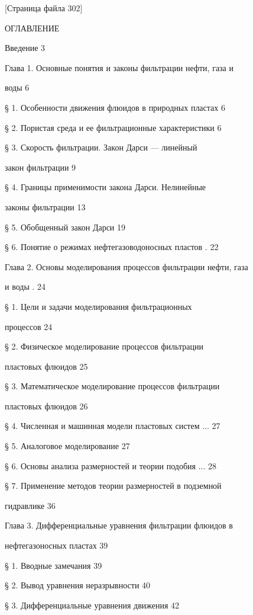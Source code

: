 \documentclass[
  11pt,
]{article}
\begin{document}
\begingroup\small\setlength{\parindent}{0pt}\setlength{\parskip}{1pt}
{[}Страница файла 302{]}\par
ОГЛАВЛЕНИЕ \par
Введение 3 \par
Глава 1. Основные понятия и законы фильтрации нефти, газа и \par
воды 6 \par
§ 1. Особенности движения флюидов в природных пластах 6 \par
§ 2. Пористая среда и ее фильтрационные характеристики 6 \par
§ 3. Скорость фильтрации. Закон Дарси --- линейный  \par
закон фильтрации 9 \par
§ 4. Границы применимости закона Дарси. Нелинейные \par
законы фильтрации 13 \par
§ 5. Обобщенный закон Дарси 19 \par
§ 6. Понятие о режимах нефтегазоводоносных пластов . 22 \par
Глава 2. Основы моделирования процессов фильтрации нефти, газа \par
и воды \textquotesingle. 24 \par
§ 1. Цели и задачи моделирования фильтрационных  \par
процессов 24 \par
§ 2. Физическое моделирование процессов фильтрации  \par
пластовых флюидов 25 \par
§ 3. Математическое моделирование процессов фильтрации \par
пластовых флюидов 26 \par
§ 4. Численная и машинная модели пластовых систем ... 27 \par
§ 5. Аналоговое моделирование 27 \par
§ 6. Основы анализа размерностей и теории подобия ... 28 \par
§ 7. Применение методов теории размерностей в подземной \par
гидравлике 36 \par
Глава 3. Дифференциальные уравнения фильтрации флюидов в  \par
нефтегазоносных пластах 39 \par
§ 1. Вводные замечания 39 \par
§ 2. Вывод уравнения неразрывности 40 \par
§ 3. Дифференциальные уравнения движения 42 \par
\end{document}
